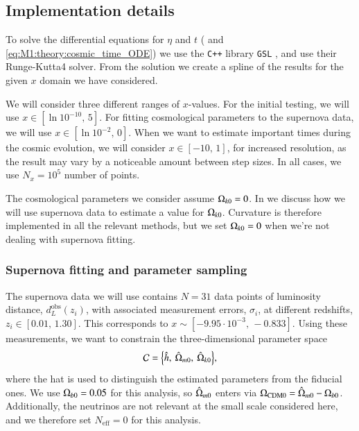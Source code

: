 
\subsection{Implementation details}\label{ssec:M1:implementations} 
To solve the differential equations for $\eta$ and $t$ ( and \eqref{eq:M1:theory:cosmic_time_ODE}) we use the \texttt{C++} library \texttt{GSL} \cite{gough2009gnu}, and use their Runge-Kutta4 solver. From the solution we create a spline of the results for the given $x$ domain we have considered. 

We will consider three different ranges of $x$-values. For the initial testing, we will use $x\in[\ln 10^{-10},\,5]$. For fitting cosmological parameters to the supernova data, we will use $x\in[\ln 10^{-2},\,0]$. When we want to estimate important times during the cosmic evolution, we will consider $x\in[-10,\,1]$, for increased resolution, as the result may vary by a noticeable amount between step sizes. In all cases, we use $N_x=10^5$ number of points.  

The cosmological parameters we consider assume $\Omega_{k0}=0$. In  we discuss how we will use supernova data to estimate a value for $\Omega_{k0}$. Curvature is therefore implemented in all the relevant methods, but we set $\Omega_{k0}=0$ when we're not dealing with supernova fitting.  

\subsubsection{Supernova fitting and parameter sampling}\label{sssec:M1:implementations:supernova_fitting}
The supernova data we will use contains $N=31$ data points of luminosity distance, $d_L^\mathrm{obs}(z_i)$, with associated measurement errors, $\sigma_i$, at different redshifts, $z_i\in[0.01,\,1.30]$. This corresponds to $x\sim[-9.95\cdot 10^{-3},\,-0.833]$. Using these measurements, we want to constrain the three-dimensional parameter space 
\begin{equation}
    \mathcal{C} = \Big\{ \hat{h},\: \hat{\Omega}_{m0},\: \hat{\Omega}_{k0} \Big\}, \label{eq:M1:implementations:supernova_parameter_space}
\end{equation}  
where the hat is used to distinguish the estimated parameters from the fiducial ones. We use $\Omega_{b0}=0.05$ for this analysis, so $\hat{\Omega}_{m0}$ enters via $\Omega_\mathrm{CDM0}=\hat{\Omega}_{m0}-\Omega_{b0}$. Additionally, the neutrinos are not relevant at the small scale considered here, and we therefore set $N_\mathrm{eff}=0$ for this analysis.  

